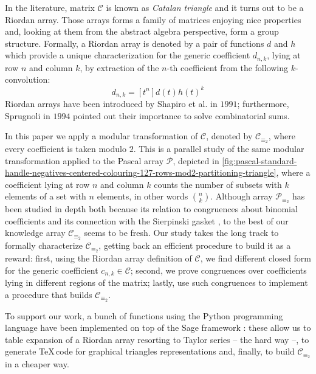 In the literature, matrix $\mathcal{C}$ is known as \emph{Catalan triangle} and
it turns out to be a Riordan array. Those arrays forms a family of matrices enjoying
nice properties and, looking at them from the abstract algebra perspective, 
form a group structure. 
Formally, a Riordan array is denoted by a pair of functions $d$ and $h$ which provide a unique 
characterization for the generic coefficient $d_{n,k}$, lying at row $n$ and column $k$, 
by extraction of the $n$-th coefficient from the following $k$-convolution:
\begin{displaymath}
    d_{n,k} = [t^{n}]d(t)h(t)^{k}
\end{displaymath}
Riordan arrays have been introduced by Shapiro et al. \cite{shapiro:1991} in $1991$;
furthermore, Sprugnoli \cite{sprugnoli:1991} in $1994$ pointed out their importance
to solve combinatorial sums.

In this paper we apply a modular transformation of $\mathcal{C}$, denoted by
$\mathcal{C}_{\equiv_{2}}$, where every coefficient is taken modulo $2$. This
is a parallel study of the same modular transformation applied to the Pascal array $\mathcal{P}$,
depicted in \autoref{fig:pascal-standard-handle-negatives-centered-colouring-127-rows-mod2-partitioning-triangle},
where a coefficient lying at row $n$ and column $k$ counts the number of subsets
with $k$ elements of a set with $n$ elements, in other words ${{n}\choose{k}}$.
Although array $\mathcal{P}_{\equiv_{2}}$ has been studied in depth both because its 
relation to congruences about binomial coefficients and its connection with
the Sierpinski gasket \cite{stewart:four:encounters:sierpinski} \cite{sokolov},
to the best of our knowledge array $\mathcal{C}_{\equiv_{2}}$ seems to be fresh.  
Our study takes the long track to formally characterize $\mathcal{C}_{\equiv_{2}}$,
getting back an efficient procedure to build it as a reward: first,
using the Riordan array definition of $\mathcal{C}$, we find different closed form for
the generic coefficient $c_{n,k}\in\mathcal{C}$; second, we prove congruences over coefficients
lying in different regions of the matrix; lastly, use such congruences to implement a procedure
that builds $\mathcal{C}_{\equiv_{2}}$. 

To support our work, a bunch of functions using the Python 
programming language have been implemented on top of the Sage framework 
\cite{sage}: these allow us to table expansion of a Riordan array
resorting to Taylor series -- the hard way --, to generate \TeX\,code
for graphical triangles representations and, finally, to build $\mathcal{C}_{\equiv_{2}}$ 
in a cheaper way.

